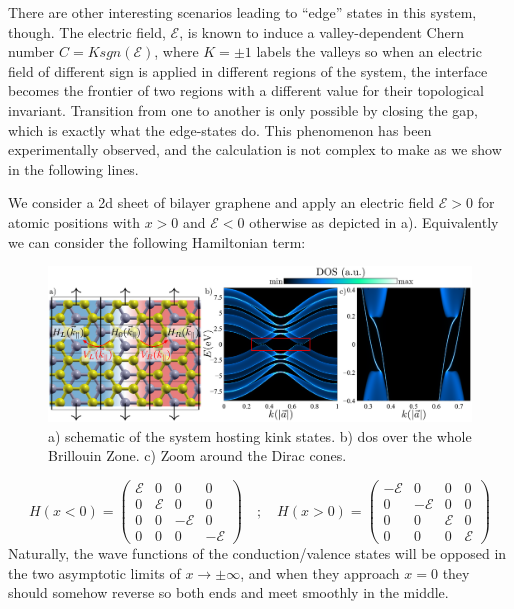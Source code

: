 There are other interesting scenarios leading to ``edge'' states in this system, though.
The electric field, $\mathcal{E}$, is known to induce a valley-dependent Chern number $C=Ksgn(\mathcal{E})$, where $K=\pm1$ labels the valleys\cite{Martin2008,San-Jose2009} so when an electric field of different sign is applied in different regions of the system\cite{Martin2008,Jung2011,Yin2016,Li2016,Li2018b}, the interface becomes the frontier of two regions with a different value for their topological invariant. Transition from one to another is only possible by closing the gap, which is exactly what the edge-states do.
This phenomenon has been experimentally observed\cite{Li2016}, and the calculation is not complex to make as we show in the following lines.

We consider a \ac{2d} sheet of bilayer graphene and apply an electric field $\mathcal{E}>0$ for atomic positions with $x>0$ and $\mathcal{E}<0$ otherwise as depicted in a). Equivalently we can consider the following Hamiltonian term:
\begin{figure}[h!]
\centering
\includegraphics{graphene_bilayer/figures/kink_states.pdf}
\vspace{-5pt}
\caption{a) schematic of the system hosting kink states. b) \ac{dos} over the whole Brillouin Zone. c) Zoom around the Dirac cones.}
\label{fig:kink_states}
\end{figure}
\begin{equation}
   H(x<0) = \left(\begin{array}{cccc}
   \mathcal{E} & 0 & 0 & 0 \\
   0 & \mathcal{E} & 0 & 0 \\
   0 & 0 & -\mathcal{E} & 0 \\
   0 & 0 & 0 & -\mathcal{E}
   \end{array}\right) \quad;\quad
   H(x>0) = \left(\begin{array}{cccc}
   -\mathcal{E} & 0 & 0 & 0 \\
   0 & -\mathcal{E} & 0 & 0 \\
   0 & 0 & \mathcal{E} & 0 \\
   0 & 0 & 0 & \mathcal{E}
   \end{array}\right)
\end{equation}
Naturally, the wave functions of the conduction/valence states will be opposed in the two asymptotic limits of $x\to\pm\infty$, and when they approach $x=0$ they should somehow reverse so both ends and meet smoothly in the middle.

